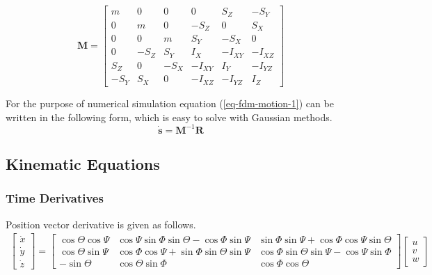 \begin{equation}
 \boldsymbol M
 =
  \left[
    \begin{matrix}
         m &    0 &    0 &    0    &     S_Z &    -S_Y \\
         0 &    m &    0 & -S_Z    &       0 &     S_X \\
         0 &    0 &    m &  S_Y    &    -S_X &       0 \\
         0 & -S_Z &  S_Y &  I_X    & -I_{XY} & -I_{XZ} \\
       S_Z &    0 & -S_X & -I_{XY} &  I_Y    & -I_{YZ} \\
      -S_Y &  S_X &    0 & -I_{XZ} & -I_{YZ} &  I_Z
    \end{matrix}
  \right]
\end{equation}

For the purpose of numerical simulation equation (\ref{eq-fdm-motion-1}) can be written in the following form, which is easy to solve with Gaussian methods.
\begin{equation}
  \label{eq-fdm-motion-2}
  \dot {\boldsymbol s} = {\boldsymbol M}^{-1} \boldsymbol R
\end{equation}

\subsection{Kinematic Equations}

\subsubsection{Time Derivatives}

Position vector derivative is given as follows. \cite{Allerton2009}
\begin{gather}
  \label{eq-fdm-position-deriv}
  \left[
    \begin{matrix}
      \dot x \\
      \dot y \\
      \dot z
    \end{matrix}
  \right]
  =
    \left[
    \begin{matrix}
       \cos \Theta \cos \Psi &
       \cos \Psi   \sin \Phi   \sin \Theta - \cos \Phi   \sin \Psi &
       \sin \Phi   \sin \Psi + \cos \Phi     \cos \Psi   \sin \Theta \\
       \cos \Theta \sin \Psi &
       \cos \Phi   \cos \Psi + \sin \Phi     \sin \Theta \sin \Psi &
       \cos \Phi   \sin \Theta \sin \Psi -   \cos \Psi   \sin \Phi \\
      -\sin \Theta &
       \cos \Theta \sin \Phi &
       \cos \Phi   \cos \Theta
    \end{matrix}
  \right]
  \left[
    \begin{matrix}
      u \\
      v \\
      w
    \end{matrix}
  \right]
\end{gather}


